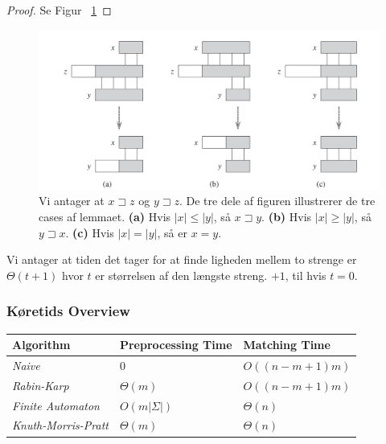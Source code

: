 \documentclass[11pt]{article}
\theoremstyle{definition}
\theoremstyle{remark}
\begin{document}
\begin{proof}
  Se Figur ~\ref{fig:overlappingsuffix}
\end{proof}

\begin{figure}[ht]
  \centering
\includegraphics[width=400pt]{main--string-matching--notation-1e22.png}
  \caption{\label{fig:overlappingsuffix} Vi antager at $x \sqsupset z$ og $y \sqsupset z$. De tre dele af figuren illustrerer de tre cases af lemmaet. \textbf{(a)} Hvis $|x| \leq |y|$, så $x \sqsupset y$. \textbf{(b)} Hvis $|x| \geq |y|$, så $y \sqsupset x$. \textbf{(c)} Hvis $|x| = |y|$, så er $x = y$.}
\end{figure}

Vi antager at tiden det tager for at finde ligheden mellem to strenge er $\Theta(t+1)$ hvor $t$ er størrelsen af den længste streng. $+1$, til hvis $t = 0$.



\subsubsection{Køretids Overview}

\begin{table}[h]
\begin{tabular}{|l|l|l|}
\hline
\textbf{Algorithm}          & \textbf{Preprocessing Time} & \textbf{Matching Time} \\ \hline
\textit{Naive}              & $0$                         & $O((n-m+1)m)$          \\ \hline
\textit{Rabin-Karp}         & $\Theta (m)$                & $O((n-m+1)m)$          \\ \hline
\textit{Finite Automaton}   & $O(m |\Sigma |)$            & $\Theta (n) $          \\ \hline
\textit{Knuth-Morris-Pratt} & $\Theta (m)$                & $\Theta (n)$           \\ \hline
\end{tabular}
\end{table}
\end{document}
